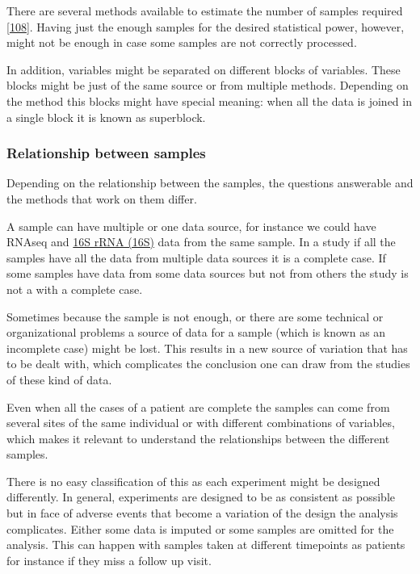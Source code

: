 \documentclass[
  12pt,
  a4paper,
  twoside,
  openright]{book}
\begin{document}
There are several methods available to estimate the number of samples required {[}\protect\hyperlink{ref-tarazona2020}{108}{]}.
Having just the enough samples for the desired statistical power, however, might not be enough in case some samples are not correctly processed.

In addition, variables might be separated on different blocks of variables.
These blocks might be just of the same source or from multiple methods.
Depending on the method this blocks might have special meaning: when all the data is joined in a single block it is known as superblock.

\hypertarget{relationship-between-samples}{%
\subsubsection{Relationship between samples}\label{relationship-between-samples}}

Depending on the relationship between the samples, the questions answerable and the methods that work on them differ.

A sample can have multiple or one data source, for instance we could have RNAseq and \protect\hyperlink{acronyms_16S}{16S rRNA (16S)} data from the same sample.
In a study if all the samples have all the data from multiple data sources it is a complete case.
If some samples have data from some data sources but not from others the study is not a with a complete case.

Sometimes because the sample is not enough, or there are some technical or organizational problems a source of data for a sample (which is known as an incomplete case) might be lost.
This results in a new source of variation that has to be dealt with, which complicates the conclusion one can draw from the studies of these kind of data.

Even when all the cases of a patient are complete the samples can come from several sites of the same individual or with different combinations of variables, which makes it relevant to understand the relationships between the different samples.

There is no easy classification of this as each experiment might be designed differently.
In general, experiments are designed to be as consistent as possible but in face of adverse events that become a variation of the design the analysis complicates.
Either some data is imputed or some samples are omitted for the analysis.
This can happen with samples taken at different timepoints as patients for instance if they miss a follow up visit.
\end{document}
